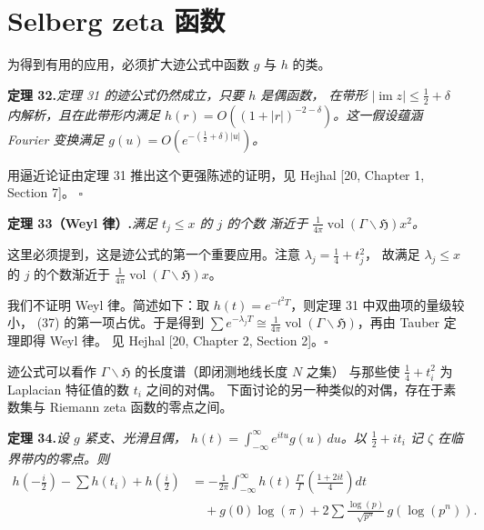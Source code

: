 \section{Selberg zeta 函数}

为得到有用的应用，必须扩大迹公式中函数 $g$ 与 $h$ 的类。

\par\medskip\noindent\textbf{定理 32.}\quad\emph{定理 31 的迹公式仍然成立，只要 $h$ 是偶函数，
在带形 $|\operatorname{im}z|\le\tfrac12+\delta$ 内解析，且在此带形内满足
$h(r)=O((1+|r|)^{-2-\delta})$。这一假设蕴涵 Fourier 变换满足
$g(u)=O(e^{-(\frac12+\delta)|u|})$。}

\smallskip
用逼近论证由定理 31 推出这个更强陈述的证明，见 Hejhal [20, Chapter 1, Section 7]。
\hfill$\square$

\par\medskip\noindent\textbf{定理 33（Weyl 律）.}\quad\emph{满足 $t_{j}\le x$ 的 $j$ 的个数
渐近于 $\frac{1}{4\pi}\operatorname{vol}(\Gamma\backslash\mathfrak{H})x^{2}$。}

\smallskip
这里必须提到，这是迹公式的第一个重要应用。注意 $\lambda_{j}=\tfrac14+t_{j}^{2}$，
故满足 $\lambda_{j}\le x$ 的 $j$ 的个数渐近于
$\frac{1}{4\pi}\operatorname{vol}(\Gamma\backslash\mathfrak{H})x$。

我们不证明 Weyl 律。简述如下：取 $h(t)=e^{-t^{2}T}$，则定理 31 中双曲项的量级较小，
(37) 的第一项占优。于是得到 $\sum e^{-\lambda_{j}T}\cong\frac{1}{4\pi}
\operatorname{vol}(\Gamma\backslash\mathfrak{H})$，再由 Tauber 定理即得 Weyl 律。
见 Hejhal [20, Chapter 2, Section 2]。\hfill$\square$

迹公式可以看作 $\Gamma\backslash\mathfrak{H}$ 的长度谱（即闭测地线长度 $N$ 之集）
与那些使 $\tfrac14+t_{i}^{2}$ 为 Laplacian 特征值的数 $t_{i}$ 之间的对偶。
下面讨论的另一种类似的对偶，存在于素数集与 Riemann zeta 函数的零点之间。

\par\medskip\noindent\textbf{定理 34.}\quad\emph{设 $g$ 紧支、光滑且偶，
$h(t)=\int_{-\infty}^{\infty}e^{itu}g(u)\,du$。以 $\tfrac12+it_{i}$ 记 $\zeta$
在临界带内的零点。则}
\begin{equation}\tag{38}
\begin{aligned}
h\!\left(-\frac{i}{2}\right)-\sum h(t_{i})+h\!\left(\frac{i}{2}\right)
&=-\frac{1}{2\pi}\int_{-\infty}^{\infty}h(t)\,
\frac{\Gamma'}{\Gamma}\!\left(\frac{1+2it}{4}\right)dt\\
&\quad+g(0)\log(\pi)+2\sum\frac{\log(p)}{\sqrt{p^{n}}}\,g(\log(p^{n})).
\end{aligned}
\end{equation}

